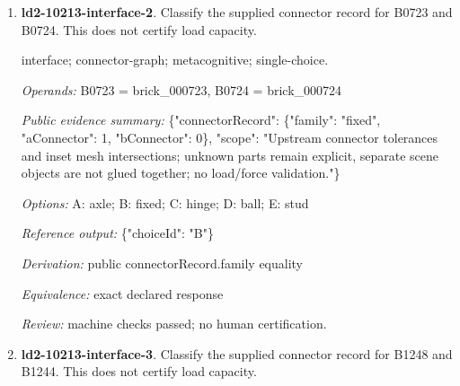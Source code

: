 \begin{enumerate}
\par{\small interface; connector-graph; metacognitive; single-choice.\par\textit{Operands:} B0645 = brick\_000645, B0800 = brick\_000800\par\textit{Public evidence summary:} \{"connectorRecord": \{"family": "axle", "aConnector": 1, "bConnector": 0\}, "scope": "Upstream connector tolerances and inset mesh intersections; unknown parts remain explicit, separate scene objects are not glued together; no load/force validation."\}\par\textit{Options:} A: axle; B: fixed; C: stud; D: ball; E: hinge\par\textit{Reference output:} \{"choiceId": "A"\}\par\textit{Derivation:} public connectorRecord.family equality\par\textit{Equivalence:} exact declared response\par\textit{Review:} machine checks passed; no human certification.}
\item \textbf{ld2-10213-interface-2}. Classify the supplied connector record for B0723 and B0724. This does not certify load capacity.
\par{\small interface; connector-graph; metacognitive; single-choice.\par\textit{Operands:} B0723 = brick\_000723, B0724 = brick\_000724\par\textit{Public evidence summary:} \{"connectorRecord": \{"family": "fixed", "aConnector": 1, "bConnector": 0\}, "scope": "Upstream connector tolerances and inset mesh intersections; unknown parts remain explicit, separate scene objects are not glued together; no load/force validation."\}\par\textit{Options:} A: axle; B: fixed; C: hinge; D: ball; E: stud\par\textit{Reference output:} \{"choiceId": "B"\}\par\textit{Derivation:} public connectorRecord.family equality\par\textit{Equivalence:} exact declared response\par\textit{Review:} machine checks passed; no human certification.}
\item \textbf{ld2-10213-interface-3}. Classify the supplied connector record for B1248 and B1244. This does not certify load capacity.

\end{enumerate}
